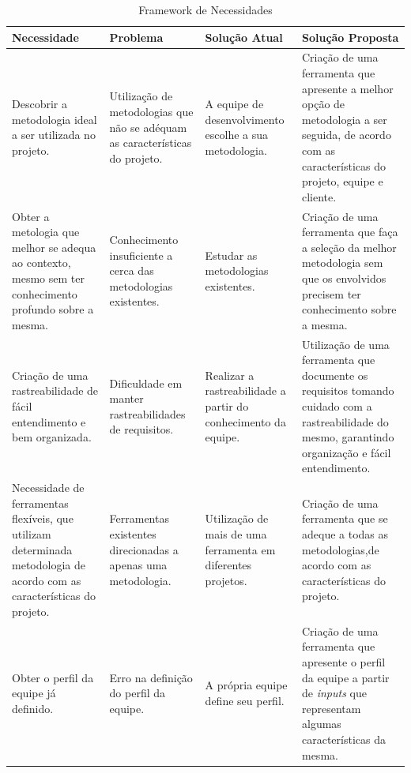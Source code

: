 \begin{table}[H]
\centering
\begin{tabular}{|p{5cm}|p{3cm}|p{3cm}|p{5cm}|}

\hline
\textbf{Necessidade} &
\textbf{Problema} &
\textbf{Solução Atual} &
\textbf{Solução Proposta}
\\ \hline
Descobrir a metodologia ideal a ser utilizada no projeto. &
Utilização de metodologias que não se adéquam as características do projeto. &
A equipe de desenvolvimento escolhe a sua metodologia. &
Criação de uma ferramenta que apresente a melhor opção de metodologia a ser seguida, de acordo com as características do projeto, equipe e cliente.
\\ \hline
Obter a metologia que melhor se adequa ao contexto, mesmo sem ter conhecimento profundo sobre a mesma. &
Conhecimento insuficiente a cerca das metodologias existentes. &
Estudar as metodologias existentes. &
Criação de uma ferramenta que faça a seleção da melhor metodologia sem que os envolvidos precisem ter conhecimento sobre a mesma.
\\ \hline
Criação de uma rastreabilidade de fácil entendimento e bem organizada. &
Dificuldade em manter rastreabilidades de requisitos. &
Realizar a rastreabilidade a partir do conhecimento da equipe. &
Utilização de uma ferramenta que documente os requisitos tomando cuidado com a rastreabilidade do mesmo, garantindo organização e fácil entendimento. 
\\ \hline
Necessidade de ferramentas flexíveis, que utilizam determinada metodologia de acordo com as características do projeto. &
Ferramentas existentes direcionadas a apenas uma metodologia. &
Utilização de mais de uma ferramenta em diferentes projetos. &
Criação de uma ferramenta que se adeque a todas as metodologias,de acordo com as características do projeto. 
\\ \hline
Obter o perfil da equipe já definido. &
Erro na definição do perfil da equipe. &
A própria equipe define seu perfil. &
Criação de uma ferramenta que apresente o perfil da equipe a partir de \textit{inputs} que representam algumas características da mesma.
\\ \hline
\end{tabular}
\caption{Framework de Necessidades}
\label{tab:frameworknecessidade}
\end{table}

